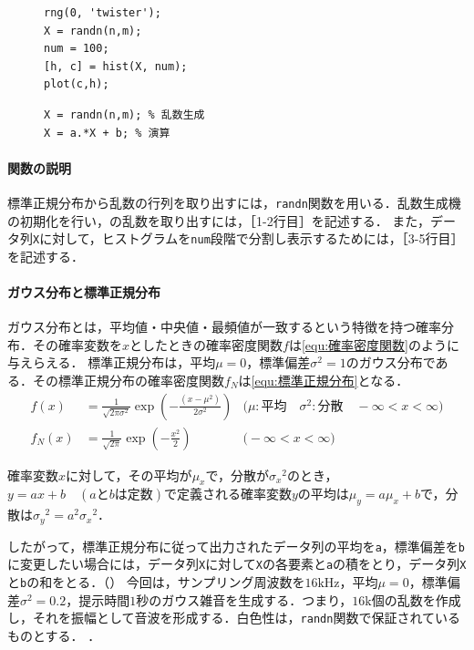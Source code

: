 \begin{figure}
    \begin{lstlisting}[caption={乱数生成・ヒストグラム},label={src:乱数生成・ヒストグラム},xleftmargin=3mm]
rng(0, 'twister');
X = randn(n,m);
num = 100;
[h, c] = hist(X, num);
plot(c,h);
    \end{lstlisting}
    \begin{lstlisting}[caption={平均と標準偏差の変更},label={src:平均と標準偏差の変更},numbers={none},xleftmargin=3mm]
X = randn(n,m); % 乱数生成
X = a.*X + b; % 演算
    \end{lstlisting}
    \vspace{-1cm}
\end{figure}
\method
\paragraph{\matlab 関数の説明}標準正規分布から乱数の行列を取り出すには，\texttt{randn}関数を用いる．乱数生成機の初期化を行い，の乱数を取り出すには，［1-2行目］を記述する．
また，データ列\texttt{X}に対して，ヒストグラムを\texttt{num}段階で分割し表示するためには，［3-5行目］を記述する．
\paragraph{ガウス分布と標準正規分布}ガウス分布とは，平均値・中央値・最頻値が一致するという特徴を持つ確率分布．その確率変数を\(x\)としたときの確率密度関数\(f\)は\eqref{equ:確率密度関数}のように与えらえる．
標準正規分布は，平均\(\mu=0\)，標準偏差\(\sigma^2=1\)のガウス分布である．その標準正規分布の確率密度関数\(f_N\)は\eqref{equ:標準正規分布}となる．
\begin{align}
    f(x)   & = \frac{1}{\sqrt{2\pi\sigma^2}}\exp\left(-\frac{(x-\mu^2)}{2\sigma^2}\right) & \big(\mu:\textrm{平均}\quad\sigma^2:\textrm{分散}\quad-\infty<x<\infty\big)\label{equ:確率密度関数} \\
    f_N(x) & =\frac{1}{\sqrt{2\pi}}\exp\left(-\frac{x^2}{2}\right)                        & \big(-\infty<x<\infty\big)\label{equ:標準正規分布}
\end{align}
\begin{leftbar}
    確率変数\(x\)に対して，その平均が\(\mu_x\)で，分散が\({\sigma_x}^2\)のとき，\(y=ax+b\quad(a\textrm{と}b\textrm{は定数})\)で定義される確率変数\(y\)の平均は\(\mu_y=a\mu_x+b\)で，分散は\({\sigma_y}^2=a^2{\sigma_x}^2\)．\hfill\cite{matlab_randn}
\end{leftbar}
したがって，標準正規分布に従って出力されたデータ列の平均を\texttt{a}，標準偏差を\texttt{b}に変更したい場合には，データ列\texttt{X}に対して\texttt{X}の各要素と\texttt{a}の積をとり，データ列\texttt{X}と\texttt{b}の和をとる．（）
今回は，サンプリング周波数を\(16\textrm{kHz}\)，平均\(\mu=0\)，標準偏差\(\sigma^2=0.2\)，提示時間\(1\)秒のガウス雑音を生成する．つまり，\(16\textrm{k}\)個の乱数を作成し，それを振幅として音波を形成する．白色性は，\texttt{randn}関数で保証されているものとする．
\scall{}．

